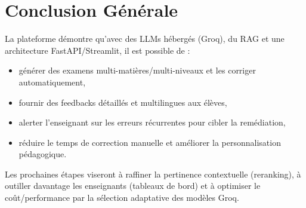 \section{Conclusion Générale}

La plateforme démontre qu’avec des LLMs hébergés (Groq), du RAG et une architecture FastAPI/Streamlit, il est possible de :
\begin{itemize}
    \item générer des examens multi-matières/multi-niveaux et les corriger automatiquement,
    \item fournir des feedbacks détaillés et multilingues aux élèves,
    \item alerter l’enseignant sur les erreurs récurrentes pour cibler la remédiation,
    \item réduire le temps de correction manuelle et améliorer la personnalisation pédagogique.
\end{itemize}
Les prochaines étapes viseront à raffiner la pertinence contextuelle (reranking), à outiller davantage les enseignants (tableaux de bord) et à optimiser le coût/performance par la sélection adaptative des modèles Groq.

